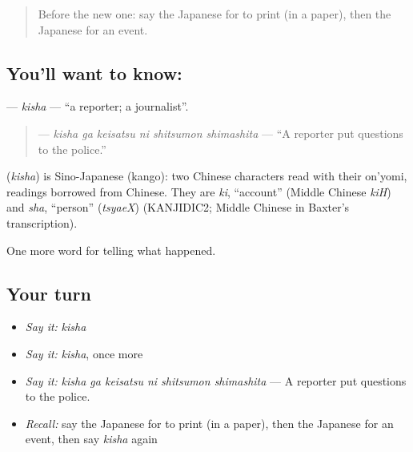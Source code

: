 \label{lesson:JA-C280-kisha}



\begin{quote}
Before the new one: say the Japanese for to print (in a paper), then the Japanese for an event.
\end{quote}

\subsection*{You'll want to know: }
\textbf{} — \emph{kisha} — \textquotedblleft{}a reporter; a journalist\textquotedblright{}.

\begin{quote}
\textbf{  } — \emph{kisha ga keisatsu ni shitsumon shimashita} — \textquotedblleft{}A reporter put questions to the police.\textquotedblright{}
\end{quote}

\begin{cousinweb}
\textbf{} (\emph{kisha}) is Sino-Japanese (kango): two Chinese characters read with their on'yomi, readings borrowed from Chinese. They are \emph{ki}, \textquotedblleft{}account\textquotedblright{} (Middle Chinese \emph{kiH}) and \emph{sha}, \textquotedblleft{}person\textquotedblright{} (\emph{tsyaeX}) (KANJIDIC2; Middle Chinese in Baxter's transcription).
\end{cousinweb}

\begin{grammarlens}[title={What you've built}]
One more word for telling what happened.
\end{grammarlens}

\subsection*{Your turn}
\begin{itemize}
\raggedright
  \item \emph{Say it:} \emph{kisha}
  \item \emph{Say it:} \emph{kisha}, once more
  \item \emph{Say it:} \emph{kisha ga keisatsu ni shitsumon shimashita} — A reporter put questions to the police.
  \item \emph{Recall:} say the Japanese for to print (in a paper), then the Japanese for an event, then say \emph{kisha} again
\end{itemize}

